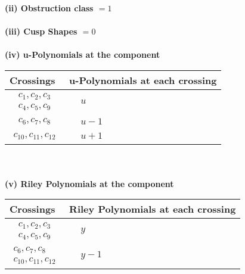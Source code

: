 \documentclass[1p]{elsarticle_modified}
\theoremstyle{definition}
\begin{document}
\flushleft \textbf{(ii) Obstruction class $= 1$}\\~\\
\flushleft \textbf{(iii) Cusp Shapes $= 0$}\\~\\
\newpage\renewcommand{\arraystretch}{1}
\flushleft \textbf{(iv) u-Polynomials at the component}\newline \\
\begin{tabular}{m{50pt}|m{274pt}}
Crossings & \hspace{64pt}u-Polynomials at each crossing \\
\hline $$\begin{aligned}c_{1},c_{2},c_{3}\\c_{4},c_{5},c_{9}\end{aligned}$$&$\begin{aligned}
&u
\end{aligned}$\\
\hline $$\begin{aligned}c_{6},c_{7},c_{8}\end{aligned}$$&$\begin{aligned}
&u-1
\end{aligned}$\\
\hline $$\begin{aligned}c_{10},c_{11},c_{12}\end{aligned}$$&$\begin{aligned}
&u+1
\end{aligned}$\\
\hline
\end{tabular}\\~\\
\newpage\renewcommand{\arraystretch}{1}
\flushleft \textbf{(v) Riley Polynomials at the component}\newline \\
\begin{tabular}{m{50pt}|m{274pt}}
Crossings & \hspace{64pt}Riley Polynomials at each crossing \\
\hline $$\begin{aligned}c_{1},c_{2},c_{3}\\c_{4},c_{5},c_{9}\end{aligned}$$&$\begin{aligned}
&y
\end{aligned}$\\
\hline $$\begin{aligned}c_{6},c_{7},c_{8}\\c_{10},c_{11},c_{12}\end{aligned}$$&$\begin{aligned}
&y-1
\end{aligned}$\\
\hline
\end{tabular}\\~\\
\end{document}
